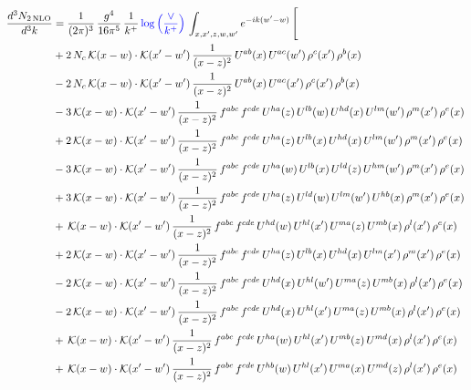 \documentclass[9pt]{article}
\numberwithin{equation}{section}
\begin{document}
\begin{align}
\frac{d^{3}N_{2\,\mathrm{NLO}}}{d^{3}k} & = \frac{1}{(2\pi)^{3}}\,\frac{g^{4}}{16\pi^{5}}\,\frac{1}{k^{+}}\,{\color{blue}\log{\left(\frac{\vee}{k^{+}}\right)}}\,\int_{x,x',z,w,w'}e^{-ik(w'-w)}\,\Bigg[
\notag\\ &+2\,N_{c}\,\mathcal{K}(x-w)\cdot\mathcal{K}(x'-w')\,\frac{1}{(x-z)^{2}}\,U^{ab}(x)\,U^{ac}(w')\,\rho^{c}(x')\,\rho^{b}(x)\notag\\
&-2\,N_{c}\,\mathcal{K}(x-w)\cdot\mathcal{K}(x'-w')\,\frac{1}{(x-z)^{2}}\,U^{ab}(x)\,U^{ac}(x')\,\rho^{c}(x')\,\rho^{b}(x)\notag\\
&-3\,\mathcal{K}(x-w)\cdot\mathcal{K}(x'-w')\,\frac{1}{(x-z)^{2}}\,f^{abc}\,f^{cde}\,U^{ha}(z)\,U^{lb}(w)\,U^{hd}(x)\,U^{lm}(w')\,\rho^{m}(x')\,\rho^{e}(x)\notag\\
&+2\,\mathcal{K}(x-w)\cdot\mathcal{K}(x'-w')\,\frac{1}{(x-z)^{2}}\,f^{abc}\,f^{cde}\,U^{ha}(z)\,U^{lb}(x)\,U^{hd}(x)\,U^{lm}(w')\,\rho^{m}(x')\,\rho^{e}(x)\notag\\
&-3\,\mathcal{K}(x-w)\cdot\mathcal{K}(x'-w')\,\frac{1}{(x-z)^{2}}\,f^{abc}\,f^{cde}\,U^{ha}(w)\,U^{lb}(x)\,U^{ld}(z)\,U^{hm}(w')\,\rho^{m}(x')\,\rho^{e}(x)\notag\\
&+3\,\mathcal{K}(x-w)\cdot\mathcal{K}(x'-w')\,\frac{1}{(x-z)^{2}}\,f^{abc}\,f^{cde}\,U^{ha}(z)\,U^{ld}(w)\,U^{lm}(w')\,U^{hb}(x)\,\rho^{m}(x')\,\rho^{e}(x)\notag\\
&+\,\mathcal{K}(x-w)\cdot\mathcal{K}(x'-w')\,\frac{1}{(x-z)^{2}}\,f^{abc}\,f^{cde}\,U^{hd}(w)\,U^{hl}(x')\,U^{ma}(z)\,U^{mb}(x)\,\rho^{l}(x')\,\rho^{e}(x)\notag\\
&+2\,\mathcal{K}(x-w)\cdot\mathcal{K}(x'-w')\,\frac{1}{(x-z)^{2}}\,f^{abc}\,f^{cde}\,U^{ha}(z)\,U^{lb}(x)\,U^{hd}(x)\,U^{lm}(x')\,\rho^{m}(x')\,\rho^{e}(x)\notag\\
&-2\,\mathcal{K}(x-w)\cdot\mathcal{K}(x'-w')\,\frac{1}{(x-z)^{2}}\,f^{abc}\,f^{cde}\,U^{hd}(x)\,U^{hl}(w')\,U^{ma}(z)\,U^{mb}(x)\,\rho^{l}(x')\,\rho^{e}(x)\notag\\
&-2\,\mathcal{K}(x-w)\cdot\mathcal{K}(x'-w')\,\frac{1}{(x-z)^{2}}\,f^{abc}\,f^{cde}\,U^{hd}(x)\,U^{hl}(x')\,U^{ma}(z)\,U^{mb}(x)\,\rho^{l}(x')\,\rho^{e}(x)\notag\\
&+\,\mathcal{K}(x-w)\cdot\mathcal{K}(x'-w')\,\frac{1}{(x-z)^{2}}\,f^{abc}\,f^{cde}\,U^{ha}(w)\,U^{hl}(x')\,U^{mb}(z)\,U^{md}(x)\,\rho^{l}(x')\,\rho^{e}(x)\notag\\
&+\,\mathcal{K}(x-w)\cdot\mathcal{K}(x'-w')\,\frac{1}{(x-z)^{2}}\,f^{abc}\,f^{cde}\,U^{hb}(w)\,U^{hl}(x')\,U^{ma}(x)\,U^{md}(z)\,\rho^{l}(x')\,\rho^{e}(x)\notag\\

\end{align}
\end{document}
